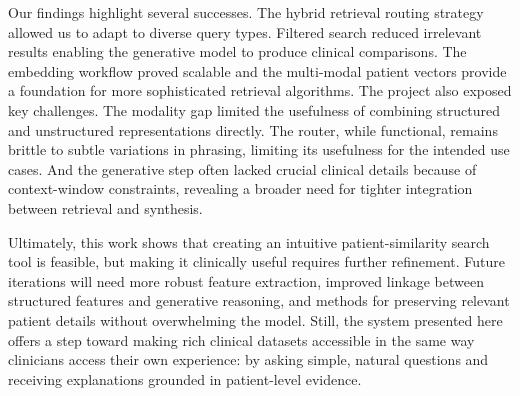 \documentclass[acmtog]{acmart}
\begin{document}
Our findings highlight several successes. The hybrid retrieval routing strategy allowed us to adapt to diverse query types. Filtered search reduced irrelevant results enabling the generative model to produce clinical comparisons. The embedding workflow proved scalable and the multi-modal patient vectors provide a foundation for more sophisticated retrieval algorithms. The project also exposed key challenges. The modality gap limited the usefulness of combining structured and unstructured representations directly. The router, while functional, remains brittle to subtle variations in phrasing, limiting its usefulness for the intended use cases. And the generative step often lacked crucial clinical details because of context-window constraints, revealing a broader need for tighter integration between retrieval and synthesis.

Ultimately, this work shows that creating an intuitive patient-similarity search tool is feasible, but making it clinically useful requires further refinement. Future iterations will need more robust feature extraction, improved linkage between structured features and generative reasoning, and methods for preserving relevant patient details without overwhelming the model. Still, the system presented here offers a step toward making rich clinical datasets accessible in the same way clinicians access their own experience: by asking simple, natural questions and receiving explanations grounded in patient-level evidence.



\end{document}
